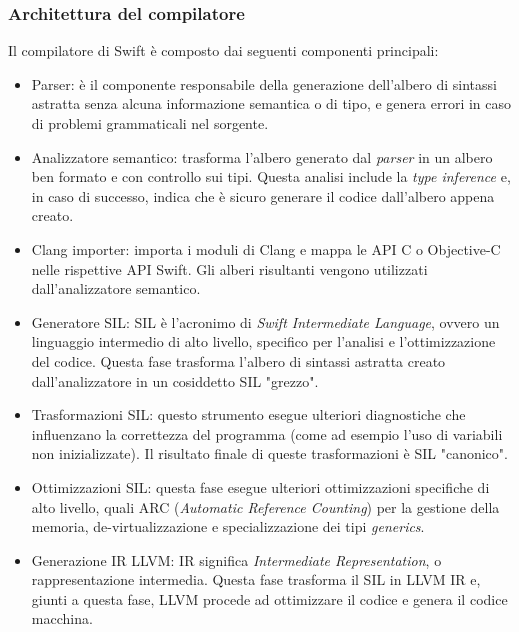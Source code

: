 \subsubsection{Architettura del compilatore}
Il compilatore di Swift è composto dai seguenti componenti principali:
\begin{itemize}
\item Parser: è il componente responsabile della generazione dell'albero di sintassi astratta senza alcuna informazione semantica o di tipo, e genera errori in caso di problemi grammaticali nel sorgente.
\item Analizzatore semantico: trasforma l'albero generato dal \textit{parser} in un albero ben formato e con controllo sui tipi. Questa analisi include la \textit{type inference} e, in caso di successo, indica che è sicuro generare il codice dall'albero appena creato.
\item Clang importer: importa i moduli di Clang e mappa le API C o Objective-C nelle rispettive API Swift. Gli alberi risultanti vengono utilizzati dall'analizzatore semantico.
\item Generatore SIL: SIL è l'acronimo di \textit{Swift Intermediate Language}, ovvero un linguaggio intermedio di alto livello, specifico per l'analisi e l'ottimizzazione del codice. Questa fase trasforma l'albero di sintassi astratta creato dall'analizzatore in un cosiddetto SIL "grezzo".
\item Trasformazioni SIL: questo strumento esegue ulteriori diagnostiche che influenzano la correttezza del programma (come ad esempio l'uso di variabili non inizializzate). Il risultato finale di queste trasformazioni è SIL "canonico".
\item Ottimizzazioni SIL: questa fase esegue ulteriori ottimizzazioni specifiche di alto livello, quali ARC (\textit{Automatic Reference Counting}) per la gestione della memoria, de-virtualizzazione e specializzazione dei tipi \textit{generics}.
\item Generazione IR LLVM: IR significa \textit{Intermediate Representation}, o rappresentazione intermedia. Questa fase trasforma il SIL in LLVM IR e, giunti a questa fase, LLVM procede ad ottimizzare il codice e genera il codice macchina.
\end{itemize}\newpage
